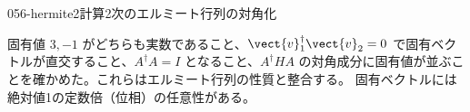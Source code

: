 \documentclass[uplatex,dvipdfmx,a4paper,11pt]{jsarticle}
\begin{document}
\begin{mondai}{056-hermite2}{計算}{2次のエルミート行列の対角化}
\begin{tadashii}
\[\]
\kenzan 固有値 $3,-1$ がどちらも実数であること、$\vect{v}_1^{\dagger}\vect{v}_2=0$ で固有ベクトルが直交すること、$A^{\dagger}A=I$ となること、$A^{\dagger}HA$ の対角成分に固有値が並ぶことを確かめた。これらはエルミート行列の性質と整合する。
\tsumazuki 固有ベクトルには絶対値1の定数倍（位相）の任意性がある。
\end{tadashii}
\end{mondai}

\end{document}
